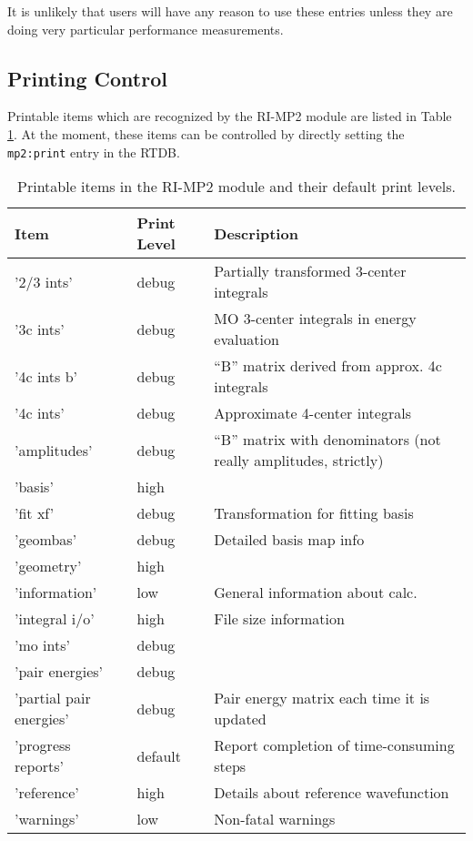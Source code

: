 It is unlikely that users will have any reason to use these entries
unless they are doing very particular performance measurements.

\subsection{Printing Control}

Printable items which are recognized by the RI-MP2 module are listed
in Table \ref{tbl:mp2-printable}.  At the moment, these items can be
controlled by directly setting the
\verb+mp2:print+ entry in the RTDB.

\begin{table}
\caption{Printable items in the RI-MP2 module and their default print levels.}
\label{tbl:mp2-printable}
\begin{tabular}{lll}
\hline\hline
Item                    & Print Level   & Description \\
\hline
'2/3 ints'              & debug         & Partially transformed 3-center integrals \\
'3c ints'               & debug         & MO 3-center integrals in energy evaluation \\
'4c ints b'             & debug         & ``B'' matrix derived from approx. 4c integrals \\
'4c ints'               & debug         & Approximate 4-center integrals \\
'amplitudes'            & debug         & ``B'' matrix with denominators (not really amplitudes, strictly) \\
'basis'                 & high          & \\
'fit xf'                & debug         & Transformation for fitting basis \\
'geombas'               & debug         & Detailed basis map info\\
'geometry'              & high          & \\
'information'           & low           & General information about calc.\\
'integral i/o'          & high          & File size information\\
'mo ints'               & debug         & \\
'pair energies'         & debug         & \\
'partial pair energies' & debug         & Pair energy matrix each time it is updated \\
'progress reports'      & default       & Report completion of time-consuming steps\\
'reference'             & high          & Details about reference wavefunction\\
'warnings'              & low           & Non-fatal warnings \\
\hline\hline
\end{tabular}
\end{table}

